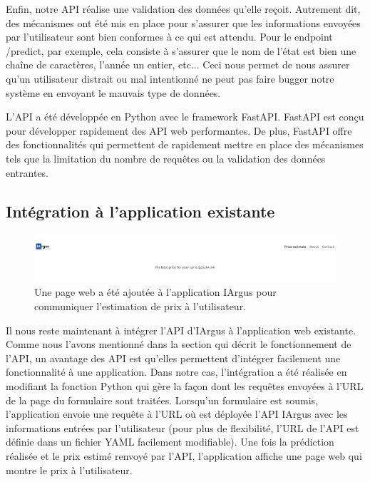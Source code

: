 \documentclass[french]{article}
\begin{document}
    Enfin, notre API réalise une validation des données qu'elle reçoit. Autrement dit, des mécanismes ont été mis en place pour s'assurer que les informations envoyées par l'utilisateur sont bien conformes à ce qui est attendu. Pour le endpoint /predict, par exemple, cela consiste à s'assurer que le nom de l'état est bien une chaîne de caractères, l'année un entier, etc... Ceci nous permet de nous assurer qu'un utilisateur distrait ou mal intentionné ne peut pas faire bugger notre système en envoyant le mauvais type de données.

    L'API a été développée en Python avec le framework FastAPI. FastAPI est conçu pour développer rapidement des API web performantes. De plus, FastAPI offre des fonctionnalités qui permettent de rapidement mettre en place des mécanismes tels que la limitation du nombre de requêtes ou la validation des données entrantes.

    \subsection{Intégration à l'application existante}

    \begin{figure}[h!]
        \includegraphics[width=12cm]{prediction_result}
        \centering
        \caption{Une page web a été ajoutée à l'application IArgus pour communiquer l'estimation de prix à l'utilisateur.}
    \end{figure}

    Il nous reste maintenant à intégrer l'API d'IArgus à l'application web existante. Comme nous l'avons mentionné dans la section qui décrit le fonctionnement de l'API, un avantage des API est qu'elles permettent d'intégrer facilement une fonctionnalité à une application. Dans notre cas, l'intégration a été réalisée en modifiant la fonction Python qui gère la façon dont les requêtes envoyées à l'URL de la page du formulaire sont traitées. Lorsqu'un formulaire est soumis, l'application envoie une requête à l'URL où est déployée l'API IArgus avec les informations entrées par l'utilisateur (pour plus de flexibilité, l'URL de l'API est définie dans un fichier YAML facilement modifiable). Une fois la prédiction réalisée et le prix estimé renvoyé par l'API, l'application affiche une page web qui montre le prix à l'utilisateur.
\end{document}
